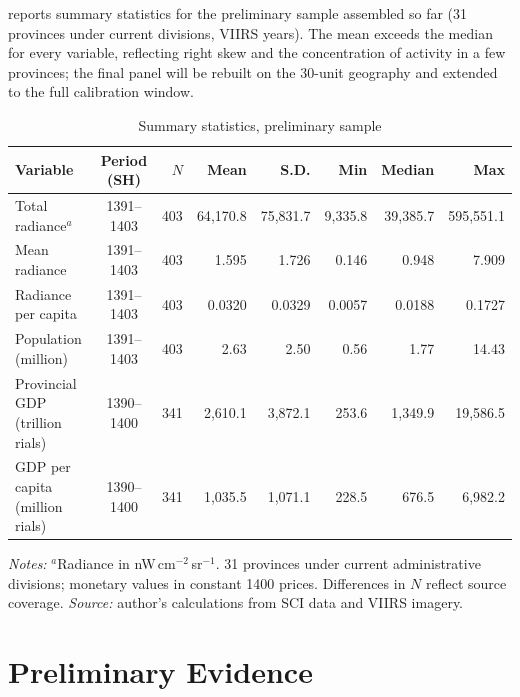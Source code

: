 \documentclass[11pt,a4paper]{article}
\begin{document}
 reports summary statistics for the preliminary sample assembled so far (31 provinces under current divisions, VIIRS years). The mean exceeds the median for every variable, reflecting right skew and the concentration of activity in a few provinces; the final panel will be rebuilt on the 30-unit geography and extended to the full calibration window.

\begin{table}[htbp]
\centering\small
\caption{Summary statistics, preliminary sample}
\label{tab:summary}
\begin{threeparttable}
\setlength{\tabcolsep}{4.2pt}\footnotesize
\begin{tabular}{@{}lcrrrrrr@{}}
\toprule
Variable & Period (SH) & $N$ & Mean & S.D. & Min & Median & Max\\
\midrule
Total radiance$^{a}$ & 1391--1403 & 403 & 64{,}170.8 & 75{,}831.7 & 9{,}335.8 & 39{,}385.7 & 595{,}551.1\\
Mean radiance & 1391--1403 & 403 & 1.595 & 1.726 & 0.146 & 0.948 & 7.909\\
Radiance per capita & 1391--1403 & 403 & 0.0320 & 0.0329 & 0.0057 & 0.0188 & 0.1727\\
Population (million) & 1391--1403 & 403 & 2.63 & 2.50 & 0.56 & 1.77 & 14.43\\
Provincial GDP (trillion rials) & 1390--1400 & 341 & 2{,}610.1 & 3{,}872.1 & 253.6 & 1{,}349.9 & 19{,}586.5\\
GDP per capita (million rials) & 1390--1400 & 341 & 1{,}035.5 & 1{,}071.1 & 228.5 & 676.5 & 6{,}982.2\\
\bottomrule
\end{tabular}
\begin{tablenotes}\footnotesize
\item \emph{Notes:} $^{a}$Radiance in nW\,cm$^{-2}$\,sr$^{-1}$. 31 provinces under current administrative divisions; monetary values in constant 1400 prices. Differences in $N$ reflect source coverage. \emph{Source:} author's calculations from SCI data and VIIRS imagery.
\end{tablenotes}
\end{threeparttable}
\end{table}

\section{Preliminary Evidence}\label{sec:prelim}
\end{document}
